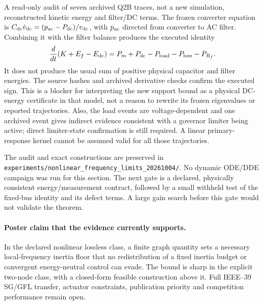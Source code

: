 A read-only audit of seven archived Q2B traces, not a new simulation,
reconstructed kinetic energy and filter/DC terms. The frozen converter
equation is
$C_{\rm dc}\dot v_{\rm dc}=(p_{\rm ac}-P_{\rm dc})/v_{\rm dc}$,
with $p_{\rm ac}$ directed from converter to AC filter.
Combining it with the filter balance produces the executed identity
\begin{equation}
 \frac{d}{dt}(K+E_f-E_{\rm dc})
 =P_m+P_{\rm dc}-P_{\rm load}-P_{\rm loss}-P_{R_f}.
 \label{eq:nfl-executed-energy}
\end{equation}
It does not produce the usual sum of positive physical capacitor and
filter energies. The source hashes and archived derivative checks confirm
the executed sign. This is a blocker for interpreting the new support
bound as a physical DC-energy certificate in that model, not a reason to
rewrite its frozen eigenvalues or reported trajectories.
Also, the load events are voltage-dependent and one archived event gives
indirect evidence consistent with a governor limiter being active; direct
limiter-state confirmation is still required. A linear primary-response kernel cannot be
assumed valid for all those trajectories.

The audit and exact constructions are preserved in
\texttt{experiments/nonlinear\_frequency\_limits\_20261004/}.
No dynamic ODE/DDE campaign was run for this section.
The next gate is a declared, physically consistent energy/measurement
contract, followed by a small withheld test of the fixed-bus identity and
its defect terms. A large gain search before this gate would not validate
the theorem.

\paragraph{Poster claim that the evidence currently supports.}
In the declared nonlinear lossless class, a finite graph quantity sets
a necessary local-frequency inertia floor that no redistribution of a
fixed inertia budget or convergent energy-neutral control can evade.
The bound is sharp in the explicit two-node class, with a closed-form
feasible construction above it. Full IEEE--39 SG/GFL transfer, actuator
constraints, publication priority and competition performance remain open.
